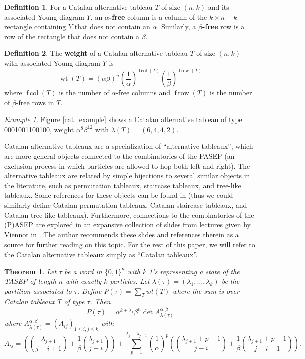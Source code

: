 \documentclass[11pt]{article}
\numberwithin{equation}{section}
\theoremstyle{plain}
\newtheorem{thm}{Theorem}[section]
\theoremstyle{definition}
\newtheorem{defn}{Definition}[section]
\theoremstyle{remark}
\newtheorem*{example}{Example}
\DeclareMathOperator{\wt}{wt}
\DeclareMathOperator{\frow}{f\,row}
\DeclareMathOperator{\fcol}{f\,col}
\begin{document}
\begin{defn}
For a Catalan alternative tableau $T$ of size $(n,k)$ and its associated Young diagram $Y$, an \textbf{$\alpha$-free} column is a column of the $k \times n-k$ rectangle containing $Y$ that does not contain an $\alpha$. Similarly, a \textbf{$\beta$-free} row is a row of the rectangle that does not contain a $\beta$.
\end{defn}

\begin{defn}\label{weight1}
The \textbf{weight} of a Catalan alternative tableau $T$ of size $(n,k)$ with associated Young diagram $Y$ is
\[
\wt(T) = (\alpha\beta)^n\left(\frac{1}{\alpha}\right)^{\fcol(T)}\left(\frac{1}{\beta}\right)^{\frow(T)}
\]
where $\fcol(T)$ is the number of $\alpha$-free columns and $\frow(T)$ is the number of $\beta$-free rows in $T$.
\end{defn}

\begin{example}
Figure \ref{cat_example} shows a Catalan alternative tableau of type 0001001100100, weight $\alpha^8\beta^{12}$ with $\lambda(T) = (6,4,4,2)$.
\end{example}

Catalan alternative tableaux are a specialization of ``alternative tableaux'', which are more general objects connected to the combinatorics of the PASEP (an exclusion process in which particles are allowed to hop both left and right). The alternative tableaux are related by simple bijections to several similar objects in the literature, such as permutation tableaux, staircase tableaux, and tree-like tableaux. Some references for these objects can be found in \cite{nadeau, treelike} (thus we could similarly define Catalan permutation tableaux, Catalan staircase tableaux, and Catalan tree-like tableaux). Furthermore, connections to the combinatorics of the (P)ASEP are explored in an expansive collection of slides from lectures given by Viennot in \cite{slides}. The author recommends these slides and references therein as a source for further reading on this topic. For the rest of this paper, we will refer to the Catalan alternative tableaux simply as ``Catalan tableaux''.


\begin{thm}\label{deter}
Let $\tau$ be a word in $\{0,1\}^n$ with $k$ 1's representing a state of the TASEP of length $n$ with exactly $k$ particles. Let $\lambda(\tau) = (\lambda_1,\ldots,\lambda_k)$ be the partition associated to $\tau$. Define $P(\tau) = \sum_T wt(T)$ where the sum is over Catalan tableaux $T$ of type $\tau$. Then
\[
P(\tau) = \alpha^{k+\lambda_1}\beta^n \det A^{\alpha,\beta}_{\lambda(\tau)}
\]
where $A^{\alpha,\beta}_{\lambda(\tau)} = (A_{ij})_{1 \leq i,j \leq k}$ with
\[
A_{ij} = \left({\lambda_{j+1} \choose j-i+1} + \frac{1}{\beta}{\lambda_{j+1} \choose j-i} \right) + \sum_{p=1}^{\lambda_j-\lambda_{j+1}} \left(\frac{1}{\alpha}\right)^p \left( {\lambda_{j+1}+p-1 \choose j-i} + \frac{1}{\beta}{\lambda_{j+1} + p-1 \choose j-i-1} \right).
\]
\end{thm}
\end{document}

